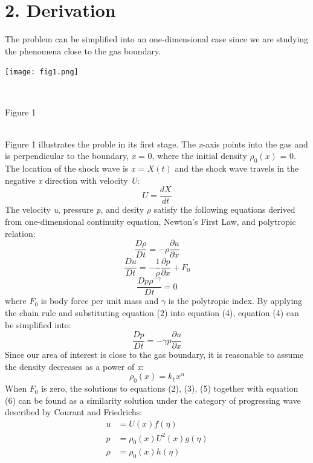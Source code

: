 \documentclass{article}
\begin{document}
\section*{2. Derivation}
The problem can be simplified into an one-dimensional case since we are studying the phenomena close to the gas boundary. 
\\
\centerline{\texttt{[image: fig1.png]}}
\\
\centerline{Figure 1}
\\
\bigbreak
\newpage
Figure 1 illustrates the proble in its first stage. The \textit{x}-axis points into the gas and is perpendicular to the boundary, \textit{x} = 0, where the initial density $\rho_0(\textit{x})$ = 0. The location of the shock wave is \textit{x} = $\textit{X}(\textit{t})$ and the shock wave travels in the negative \textit{x} direction with velocity \textit{U}: 
\begin{equation}
U = \frac{dX}{dt}
\end{equation}
The velocity \textit{u}, pressure \textit{p}, and desity $\rho$ satisfy the following equations derived from one-dimensional continuity equation, Newton's First Law, and polytropic relation:
\begin{equation}
\frac{D\rho}{Dt} = -\rho\frac{\partial u}{\partial x}
\end{equation}
\begin{equation}
\frac{Du}{Dt} = -\frac{1}{\rho}\frac{\partial p}{\partial x}+F_0
\end{equation}
\begin{equation}
\frac{Dp\rho^{-\gamma}}{Dt} = 0
\end{equation}
where $F_0$ is body force per unit mass and $\gamma$ is the polytropic index. By applying the chain rule and substituting equation (2) into equation (4), equation (4) can be simplified into:
\begin{equation}
\frac{Dp}{Dt} = -\gamma p\frac{\partial u}{\partial x}
\end{equation}
Since our area of interest is close to the gas boundary, it is reasonable to assume the density decreases as a power of \textit {x}:
\begin{equation}
\rho_0(x) = k_1x^\alpha
\end{equation}
When $F_0$ is zero, the solutions to equations (2), (3), (5) together with equation (6) can be found as a similarity solution under the category of progressing wave described by Courant and Friedrichs:
\begin{equation}
    \begin{split}
        u &= U(x)f(\eta) \\
        p &= \rho_0(x)U^2(x)g(\eta) \\
        \rho &= \rho_0(x)h(\eta)
    \end{split}
\end{equation}
\end{document}

